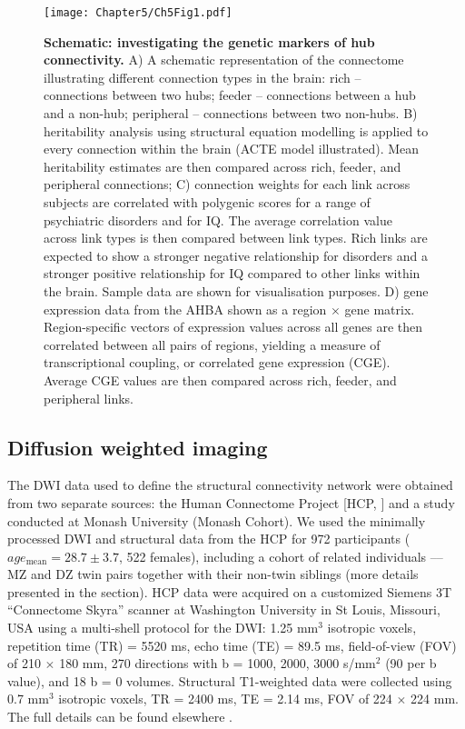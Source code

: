 \begin{figure}[h!]
\begin{center}
\texttt{[image: Chapter5/Ch5Fig1.pdf]}%
\end{center}
\caption{\textbf{Schematic: investigating the genetic markers of hub connectivity.}
A) A schematic representation of the connectome illustrating different connection types in the brain: rich – connections between two hubs; feeder – connections between a hub and a non-hub; peripheral – connections between two non-hubs. 
B) heritability analysis using structural equation modelling is applied to every connection within the brain (ACTE model illustrated). Mean heritability estimates are then compared across rich, feeder, and peripheral connections; 
C) connection weights for each link across subjects are correlated with polygenic scores for a range of psychiatric disorders and for IQ. The average correlation value across link types is then compared between link types. Rich links are expected to show a stronger negative relationship for disorders and a stronger positive relationship for IQ compared to other links within the brain. Sample data are shown for visualisation purposes. D) gene expression data from the AHBA shown as a region $\times$ gene matrix. Region-specific vectors of expression values across all genes are then correlated between all pairs of regions, yielding a measure of transcriptional coupling, or correlated gene expression (CGE). Average CGE values are then compared across rich, feeder, and peripheral links.}
\label{fig:Ch5Fig1}
\end{figure}

\subsection*{Diffusion weighted imaging}
\label{sec:DWI}

The DWI data used to define the structural connectivity network were obtained from two separate sources: the Human Connectome Project [HCP, \citep{VanEssen2013}] and a study conducted at Monash University (Monash Cohort). We used the minimally processed DWI and structural data from the HCP for 972 participants ($age_\mathrm{mean} = 28.7 \pm 3.7$, 522 females), including a cohort of related individuals –-- MZ and DZ twin pairs together with their non-twin siblings (more details presented in the  section). HCP data were acquired on a customized Siemens 3T ``Connectome Skyra'' scanner at Washington University in St Louis, Missouri, USA using a multi‐shell protocol for the DWI: 1.25 mm$^{3}$ isotropic voxels, repetition time (TR) = 5520 ms, echo time (TE) = 89.5 ms,  field-of-view (FOV) of 210 $\times$ 180 mm, 270 directions with b = 1000, 2000, 3000 s/mm$^{2}$ (90 per b value), and 18 b = 0 volumes. Structural T1-weighted data were collected using 0.7 mm$^{3}$ isotropic voxels, TR = 2400 ms, TE = 2.14 ms, FOV of 224 $\times$ 224 mm. The full details can be found elsewhere \citep{Glasser2013}.

